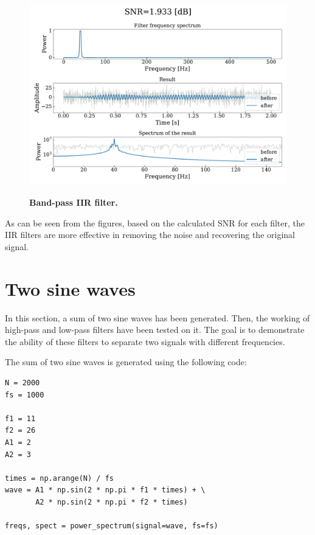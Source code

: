 \documentclass[13pt,a4paper]{article}
\begin{document}
\begin{figure}[ht!]
    \centering
    \caption{\textbf{Band-pass IIR filter.}}
    \includegraphics[width=0.9\linewidth]{iir.bandpass.pdf}
    \label{fig:iir.band-pass}
\end{figure}
\pagebreak

As can be seen from the figures, based on the calculated SNR for each filter, the IIR filters are more effective in removing the noise and recovering the original signal.


\section{Two sine waves}

In this section, a sum of two sine waves has been generated. Then, the working of high-pass and low-pass filters have been tested on it. The goal is to demonstrate the ability of these filters to separate two signals with different frequencies.

The sum of two sine waves is generated using the following code:

\begin{lstlisting}[caption={\textbf{Code snippet for generating the two sine waves.}}]
N = 2000
fs = 1000

f1 = 11
f2 = 26
A1 = 2
A2 = 3

times = np.arange(N) / fs
wave = A1 * np.sin(2 * np.pi * f1 * times) + \
       A2 * np.sin(2 * np.pi * f2 * times)

freqs, spect = power_spectrum(signal=wave, fs=fs)
\end{lstlisting}
\end{document}
